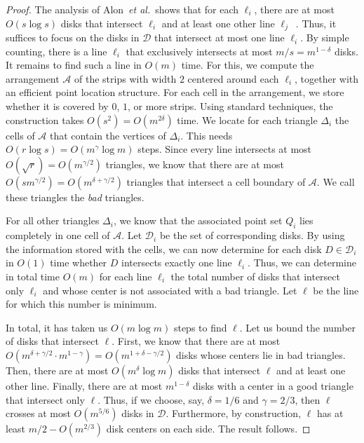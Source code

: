 \documentclass{paper}
\newcommand {\script} [1] {\ensuremath {\mathcal {#1}}}
\newcommand {\etal} {\textit {et al.}}
\newcommand {\D} {\script {D}}
\begin{document}
\begin{proof}
The analysis of Alon~\etal\ shows that for each $\ell_i$, there are at
most $O(s \log s)$ disks that intersect $\ell_i$ and at least one other line
$\ell_j$~\cite[Section~2]{akp-cddsl-89}. Thus, it suffices to focus on the 
disks in $\D$ that intersect
at most one line $\ell_i$. By simple counting, there is a line
$\ell_i$ that exclusively intersects at most $m/s = m^{1-\delta}$ disks. 
It remains to find such a line in $O(m)$ time. For this, we compute 
the arrangement $\mathcal{A}$ of the strips with width $2$ centered
around each $\ell_i$, together with an efficient point location 
structure. For each cell in the arrangement, we store whether it is covered
by $0$, $1$, or more strips. Using standard techniques, the construction 
takes $O(s^2) = O(m^{2\delta})$ time. 
We locate for each triangle $\Delta_i$ the cells of $\mathcal{A}$
that contain the vertices of $\Delta_i$. This needs 
$O(r \log s) = O(m^{\gamma}\log m)$ steps.
Since every line intersects at most $O(\sqrt{r}) = O(m^{\gamma/2})$ triangles,
we know that there are at most $O(sm^{\gamma/2}) = O(m^{\delta+\gamma/2})$ 
triangles that intersect a cell boundary of $\mathcal{A}$. We call these
triangles the \emph{bad} triangles.

For all other triangles $\Delta_i$, we know that the associated point set
$Q_i$ lies completely in one cell of $\mathcal{A}$. Let $\D_i$ be the 
set of corresponding disks. By using the information stored with the cells, we 
can now determine for each disk $D \in \D_i$ in
$O(1)$ time whether $D$ intersects exactly one line $\ell_i$.
Thus, we can determine in total time $O(m)$ for each line $\ell_i$ the total
number of disks that intersect only $\ell_i$ and whose center is not 
associated with
a bad triangle. Let $\ell$ be the line for which this number is minimum.

In total, it has taken us $O(m\log m)$ steps to find $\ell$. Let us
bound the number of disks that intersect $\ell$. First, we know that
there are at most 
$O(m^{\delta + \gamma/2}\cdot m^{1-\gamma}) = O(m^{1 + \delta - \gamma/2})$
disks whose centers lie in bad triangles. Then, there are at most
$O(m^{\delta}\log m)$ disks that intersect $\ell$ and at least one other line.
Finally, there are at most $m^{1-\delta}$ disks with a center in a good 
triangle that intersect only $\ell$. Thus, if we choose, say, 
$\delta = 1/6$  and $\gamma = 2/3$, 
then $\ell$ crosses at most $O(m^{5/6})$ disks in $\D$. Furthermore, 
by construction, $\ell$ has at least $m/2 - O(m^{2/3})$ disk centers on 
each side. The result follows.
\end{proof}
\end{document}
